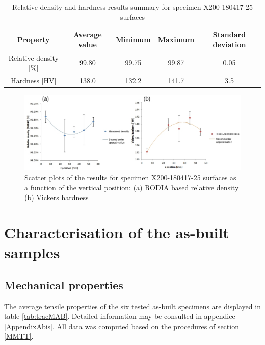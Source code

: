 \begin{center}
	\begin{table}[ht]
		\begin{tabular}{|c|c |c |c| c|}
			\hline
			Property& Average value & Minimum & Maximum & Standard deviation \\
			\hline 
			\hline   
			Relative density [\%] & 99.80 & 99.75 & 99.87 & 0.05\\
			Hardness [HV] &138.0 &132.2 &141.7&3.5\\
			\hline
		\end{tabular}

		\caption[Relative density and hardness results summary for specimen X200-180417-25 surfaces]{Relative density and hardness results summary for specimen X200-180417-25 surfaces}
		\label{tab:25}
	\end{table}
\end{center}


\begin{figure}[ht]
\centering
\centerline{\includegraphics[scale=0.62]{Images/SausHD}}
\decoRule
\caption[Scatter plots of the results for specimen X200-180417-25 surfaces as a function of the vertical position: (a) RODIA based relative density (b) Vickers hardness]{Scatter plots of the results for specimen X200-180417-25 surfaces as a function of the vertical position: (a) RODIA based relative density (b) Vickers hardness}
\label{fig:HD-180417}
\end{figure} 


\section{Characterisation of the as-built samples} 
\label{RCABS}

\subsection{Mechanical properties}

The average tensile properties of the six tested as-built specimens are displayed in table \ref{tab:tracMAB}. Detailed information may be consulted in appendice \ref{AppendixAbis}. All data was computed based on the procedures of section \ref{MMTT}.\\

